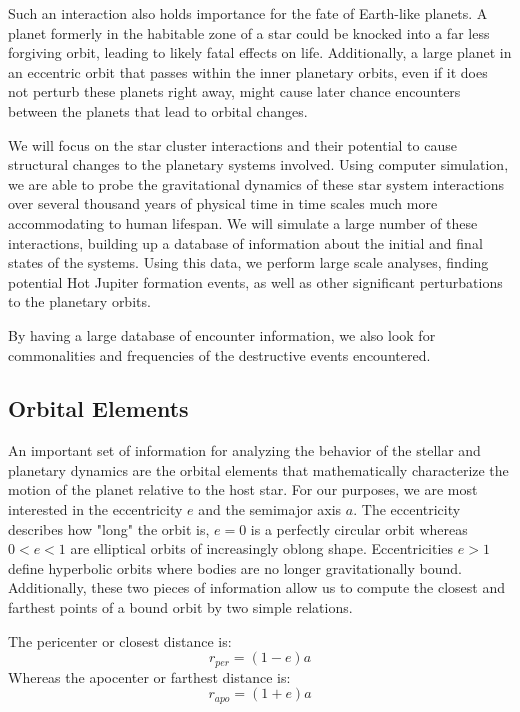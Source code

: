 \documentclass[12pt]{article}
\begin{document}
Such an interaction also holds importance for the fate of Earth-like planets.
A planet formerly in the habitable zone of a star could be knocked into a far less
forgiving orbit, leading to likely fatal effects on life. Additionally, a
large planet in an eccentric orbit that passes within the inner planetary orbits,
even if it does not perturb these planets right away, might cause later chance
encounters between the planets that lead to orbital changes.

We will focus on the star cluster interactions and their potential to 
cause structural changes to the planetary systems involved. Using computer simulation,
we are able to probe the gravitational dynamics of these star system 
interactions over several thousand years of physical time 
in time scales much more accommodating to human lifespan. We will simulate
a large number of these interactions, building up a database of information about
the initial and final states of the systems. Using this data, we perform large
scale analyses, finding potential Hot Jupiter formation events, as well as other
significant perturbations to the planetary orbits.

By having a large database of encounter information, we also look for commonalities
and frequencies of the destructive events encountered. 


\subsection{Orbital Elements}

    An important set of information for analyzing the behavior of the stellar and
    planetary dynamics are the orbital elements that mathematically 
    characterize the motion of the planet relative to the host star. 
    For our purposes, we are most interested in the eccentricity $e$ and the
    semimajor axis $a$. The eccentricity describes how "long" the orbit is, $e=0$
    is a perfectly circular orbit whereas $0<e<1$ are elliptical orbits of increasingly
    oblong shape. Eccentricities $e>1$ define hyperbolic orbits where bodies are no longer
    gravitationally bound. Additionally, these two pieces of information allow us to 
    compute the closest and farthest points of a bound orbit by two simple relations.

    The pericenter or closest distance is:
    \begin{equation}
        r_{per} = (1 - e) a
    \end{equation}
    Whereas the apocenter or farthest distance is:
    \begin{equation}
        r_{apo} = (1 + e) a
    \end{equation}
\end{document}

